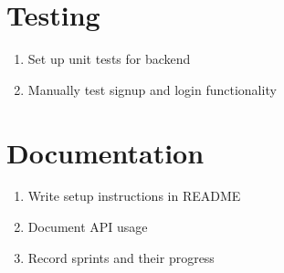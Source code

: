 \documentclass[10pt,titlepage]{article}
\begin{document}
	\section*{Testing}
	\begin{enumerate}
		\item Set up unit tests for backend
		\item Manually test signup and login functionality
	\end{enumerate}
	
	\section*{Documentation}
	\begin{enumerate}
		\item Write setup instructions in README
		\item Document API usage
		\item Record sprints and their progress
	\end{enumerate}
	
	
	
	
\end{document}
